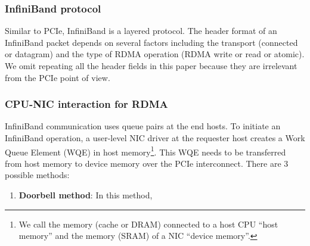 \subsubsection{InfiniBand protocol}
Similar to PCIe, InfiniBand is a layered protocol. The header format of an
InfiniBand packet depends on several factors including the transport (connected
or datagram) and the type of RDMA operation (RDMA write or read or atomic). We
omit repeating all the header fields in this paper because they are irrelevant
from the PCIe point of view.

\subsubsection{CPU-NIC interaction for RDMA}
InfiniBand communication uses queue pairs at the end hosts. To initiate an
InfiniBand operation, a user-level NIC driver at the requester host creates
a Work Queue Element (WQE) in host memory\footnote{We call the memory (cache
or DRAM) connected to a host CPU ``host memory'' and the memory (SRAM) of a NIC
``device memory''.}. This WQE needs to be transferred from host memory to device
memory over the PCIe interconnect. There are 3 possible methods:

\begin{enumerate}
\item \textbf{Doorbell method}: In this method, 
\end{enumerate}
